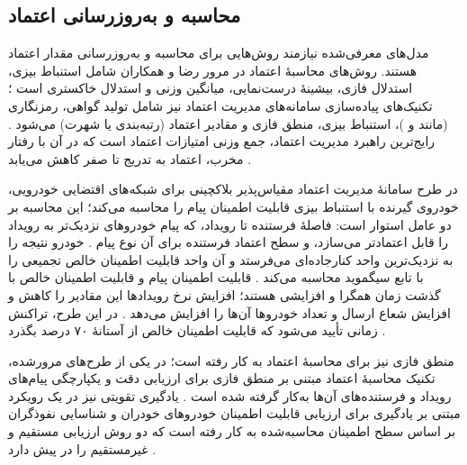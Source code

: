 \subsection{محاسبه و به‌روزرسانی اعتماد}

مدل‌های معرفی‌شده نیازمند روش‌هایی برای محاسبه و به‌روزرسانی مقدار اعتماد هستند. روش‌های محاسبهٔ اعتماد در مرور رضا و همکاران شامل استنباط بیزی، استدلال فازی، بیشینهٔ درست‌نمایی، میانگین وزنی و استدلال خاکستری است \cite{razaBlockchainBasedReputationTrust2024}؛ تکنیک‌های پیاده‌سازی سامانه‌های مدیریت اعتماد نیز شامل تولید گواهی، رمزنگاری (مانند  و )، استنباط بیزی، منطق فازی و مقادیر اعتماد (رتبه‌بندی یا شهرت) می‌شود \cite{razaBlockchainBasedReputationTrust2024}. رایج‌ترین راهبرد مدیریت اعتماد، جمع وزنی امتیازات اعتماد است که در آن با رفتار مخرب، اعتماد به تدریج تا صفر کاهش می‌یابد \cite{farsimadanReviewSecurityChallenges2025}.

در طرح سامانهٔ مدیریت اعتماد مقیاس‌پذیر بلاکچینی برای شبکه‌های اقتضایی خودرویی، خودروی گیرنده با استنباط بیزی قابلیت اطمینان پیام را محاسبه می‌کند؛ این محاسبه بر دو عامل استوار است: فاصلهٔ فرستنده تا رویداد، که پیام خودروهای نزدیک‌تر به رویداد را قابل اعتمادتر می‌سازد، و سطح اعتماد فرستنده برای آن نوع پیام \cite{ghovanlooyghajarSBTMSScalableBlockchain2021}. خودرو نتیجه را به نزدیک‌ترین واحد کنارجاده‌ای می‌فرستد و آن واحد قابلیت اطمینان خالص تجمیعی را با تابع سیگموید محاسبه می‌کند \cite{ghovanlooyghajarSBTMSScalableBlockchain2021}. قابلیت اطمینان پیام و قابلیت اطمینان خالص با گذشت زمان همگرا و افزایشی هستند؛ افزایش نرخ رویدادها این مقادیر را کاهش و افزایش شعاع ارسال و تعداد خودروها آن‌ها را افزایش می‌دهد \cite{ghovanlooyghajarSBTMSScalableBlockchain2021}. در این طرح، تراکنش زمانی تأیید می‌شود که قابلیت اطمینان خالص از آستانهٔ ۷۰ درصد بگذرد \cite{ghovanlooyghajarSBTMSScalableBlockchain2021}.

منطق فازی نیز برای محاسبهٔ اعتماد به کار رفته است؛ در یکی از طرح‌های مرورشده، تکنیک محاسبهٔ اعتماد مبتنی بر منطق فازی برای ارزیابی دقت و یکپارچگی پیام‌های رویداد و فرستنده‌های آن‌ها به‌کار گرفته شده است \cite{farsimadanReviewSecurityChallenges2025}. یادگیری تقویتی نیز در یک رویکرد مبتنی بر یادگیری  برای ارزیابی قابلیت اطمینان خودروهای خودران و شناسایی نفوذگران بر اساس سطح اطمینان محاسبه‌شده به کار رفته است که دو روش ارزیابی مستقیم و غیرمستقیم را در پیش دارد \cite{farsimadanReviewSecurityChallenges2025}.

